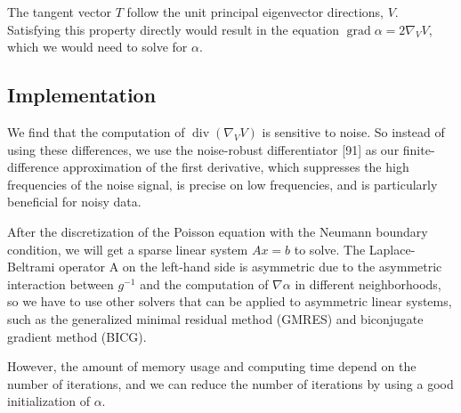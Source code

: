 \documentclass{article}
\theoremstyle{definition}
\theoremstyle{plain}
\begin{document}
The tangent vector $T$ follow the unit principal eigenvector directions, $V$. Satisfying this property directly would result in the equation $\operatorname{grad} \alpha = 2\nabla_VV$, which we would need to solve for $\alpha$.

\subsection{Implementation}
We find that the computation of $\operatorname{div}(\nabla_VV)$ is sensitive to noise. So instead of using these differences, we use the noise-robust differentiator [91] as our finite-difference approximation of the first derivative, which suppresses the high frequencies
of the noise signal, is precise on low frequencies, and is particularly beneficial for noisy data.

After the discretization of the Poisson equation with the Neumann boundary condition,
we will get a sparse linear system $Ax = b$ to solve. The Laplace-Beltrami operator A on the left-hand side is asymmetric due to the asymmetric interaction between $g^{-1}$ and the computation of $\nabla\alpha$ in different neighborhoods, so we have to use other solvers that can be applied to asymmetric linear systems, such as the generalized minimal residual method (GMRES)\cite{gmres1,gmres2} and biconjugate gradient method (BICG). 

However, the amount of memory usage and computing time depend on the number of iterations, and we can reduce the number of iterations by using a good initialization of $\alpha$.
\end{document}
